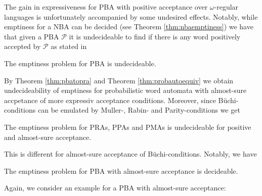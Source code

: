 The gain in expressiveness for \ac{PBA} with positive acceptance over 
$\omega$-regular languages is unfortunately accompanied by some undesired 
effects. Notably, while emptiness for a \ac{NBA} can be decided (see Theorem 
\ref{thm:nbaemptiness}) we have that given a \ac{PBA} $\mathcal{P}$ it is 
undecideable to find if there is any word positively accepted by $\mathcal{P}$ 
as stated in
\begin{theorem}
  \cite[Theorem 2]{DecProblemsForProbAuto}
  The emptiness problem for \ac{PBA} is undecideable.
  \label{thm:emptinesspospba}
\end{theorem}
By Theorem \ref{thm:pbatopra} and Theorem \ref{thm:probautoequiv} we obtain
undecideability of emptiness for probabilistic word automata with 
almost-sure accpetance of more expressiv acceptance conditions. Moreover, since 
Büchi-conditions can be emulated by Muller-, Rabin- and Parity-conditions we
get
\begin{corollary}
  The emptiness problem for \acp{PRA}, \acp{PPA} and \acp{PMA} is undecideable
  for positive and almost-sure acceptance.
  \label{cor:emptinessstrongalmostsureprob}
\end{corollary}
This is different for almost-sure acceptance of Büchi-conditions. Notably, we
have
\begin{theorem}
  \cite[Theorem 6]{DecProblemsForProbAuto}
  The emptiness problem for \ac{PBA} with almost-sure acceptance is decideable.
  \label{thm:emptinessalmostsurepba}
\end{theorem}
Again, we consider an example for a \ac{PBA} with almost-sure acceptance:
